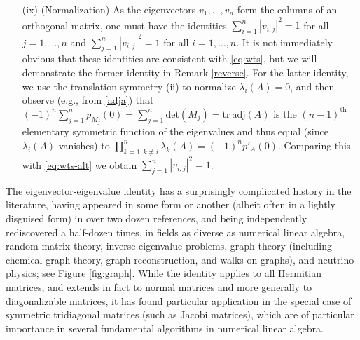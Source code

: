 \documentclass{amsart}
\begin{document}
\begin{itemize}
\item[(ix)]  (Normalization)  As the eigenvectors $v_1,\dots,v_n$ form the columns of an orthogonal matrix, one must have the identities $\sum_{i=1}^n |v_{i,j}|^2 = 1$ for all $j=1,\dots,n$ and $\sum_{j=1}^n |v_{i,j}|^2 = 1$ for all $i=1,\dots,n$.  It is not immediately obvious that these identities are consistent with \eqref{eq:wts}, but we will demonstrate the former identity in Remark \ref{reverse}.  For the latter identity, we use the translation symmetry (ii) to normalize $\lambda_i(A)=0$, and then observe (e.g., from \eqref{adja}) that $(-1)^n \sum_{j=1}^n p_{M_j}(0) = \sum_{j=1}^n \mathrm{det}(M_j) = \mathrm{tr}\ \mathrm{adj}(A)$ is the $(n-1)^{\mathrm{th}}$ elementary symmetric function of the eigenvalues and thus equal (since $\lambda_i(A)$ vanishes) to $\prod_{k=1;k \neq i}^n \lambda_k(A) = (-1)^n p'_A(0)$.  Comparing this with \eqref{eq:wts-alt} we obtain $\sum_{j=1}^n |v_{i,j}|^2=1$.
\end{itemize}

The eigenvector-eigenvalue identity has a surprisingly complicated history in the literature, having appeared in some form or another (albeit often in a lightly disguised form) in over two dozen references, and being independently rediscovered a half-dozen times, in fields as diverse as numerical linear algebra, random matrix theory, inverse eigenvalue problems, graph theory (including chemical graph theory, graph reconstruction, and walks on graphs), and neutrino physics; see Figure \ref{fig:graph}.  While the identity applies to all Hermitian matrices, and extends in fact to normal matrices and more generally to diagonalizable matrices, it has found particular application in the special case of symmetric tridiagonal matrices (such as Jacobi matrices), which are of particular importance in several fundamental algorithms in numerical linear algebra.  
\end{document}
